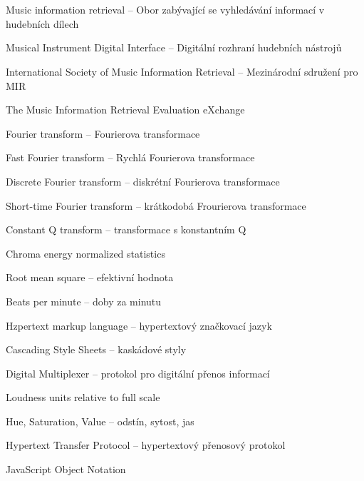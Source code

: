 \cleardoublepage
\chapter*{\listofabbrevname}
{}

\begin{acronym}[KolikMista]
		{Music information retrieval -- Obor zabývající se vyhledávání informací v hudebních dílech}
	
		{Musical Instrument Digital Interface -- Digitální rozhraní hudebních nástrojů}

		{International Society of Music Information Retrieval -- Mezinárodní sdružení pro \acs*{MIR}}	

		{The Music Information Retrieval Evaluation eXchange}

		{Fourier transform -- Fourierova transformace}
		
		{Fast Fourier transform -- Rychlá Fourierova transformace}

		{Discrete Fourier transform -- diskrétní Fourierova transformace}

		{Short-time Fourier transform -- krátkodobá Frourierova transformace}

		{Constant Q transform -- transformace s konstantním Q}
	
		{Chroma energy normalized statistics}
	
		{Root mean square -- efektivní hodnota}

		{Beats per minute -- doby za minutu}

		{Hzpertext markup language --  hypertextový značkovací jazyk}

	{Cascading Style Sheets -- kaskádové styly}

		{Digital Multiplexer -- protokol pro digitální přenos informací}
	
		{Loudness units relative to full scale}
	
		{Hue, Saturation, Value -- odstín, sytost, jas}

		{Hypertext Transfer Protocol -- hypertextový přenosový protokol}

	{JavaScript Object Notation}
\end{acronym}
